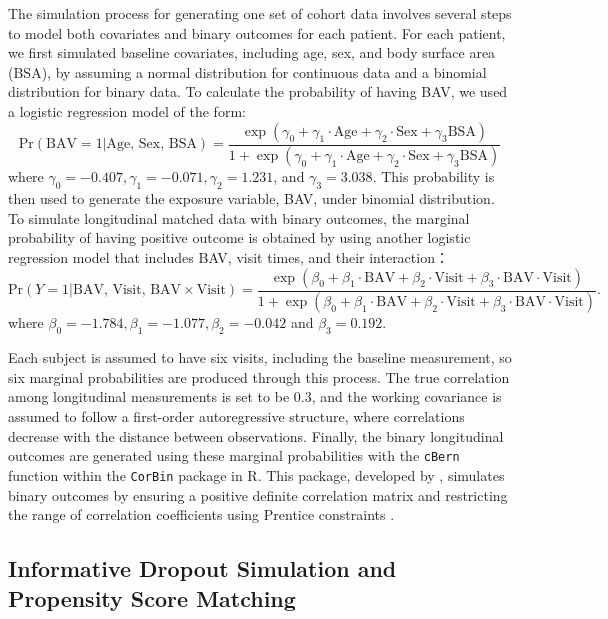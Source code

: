 \documentclass[
]{aft}
\begin{document}
The simulation process for generating one set of cohort data involves
several steps to model both covariates and binary outcomes for each
patient. For each patient, we first simulated baseline covariates,
including age, sex, and body surface area (BSA), by assuming a normal
distribution for continuous data and a binomial distribution for binary
data. To calculate the probability of having BAV, we used a logistic
regression model of the form: \[
\text{Pr}(\text{BAV} = 1 | \text{Age, Sex, BSA}) = \frac{\exp(\gamma_0 + \gamma_1 \cdot \text{Age} + \gamma_2 \cdot \text{Sex} + \gamma_3 \text{BSA})}{1+\exp(\gamma_0 + \gamma_1 \cdot \text{Age} + \gamma_2 \cdot \text{Sex} + \gamma_3 \text{BSA})}
\] where \(\gamma_0 = -0.407, \gamma_1 = -0.071, \gamma_2 = 1.231\), and
\(\gamma_3 = 3.038\). This probability is then used to generate the
exposure variable, BAV, under binomial distribution. To simulate
longitudinal matched data with binary outcomes, the marginal probability
of having positive outcome is obtained by using another logistic
regression model that includes BAV, visit times, and their interaction：
\[
\text{Pr}(Y = 1 | \text{BAV, Visit, BAV} \times \text{Visit}) = \frac{\exp(\beta_0 + \beta_1 \cdot \text{BAV} + \beta_2 \cdot \text{Visit} + \beta_3 \cdot \text{BAV}\cdot \text{Visit})}{1+\exp(\beta_0 + \beta_1 \cdot \text{BAV} + \beta_2 \cdot \text{Visit} + \beta_3 \cdot \text{BAV}\cdot \text{Visit})}.
\] where \(\beta_0 = -1.784, \beta_1 = -1.077, \beta_2 = -0.042\) and
\(\beta_3 = 0.192\).

Each subject is assumed to have six visits, including the baseline
measurement, so six marginal probabilities are produced through this
process. The true correlation among longitudinal measurements is set to
be 0.3, and the working covariance is assumed to follow a first-order
autoregressive structure, where correlations decrease with the distance
between observations. Finally, the binary longitudinal outcomes are
generated using these marginal probabilities with the \texttt{cBern}
function within the \texttt{CorBin} package in R. This package,
developed by \citet{cbernWei}, simulates binary outcomes by ensuring a
positive definite correlation matrix and restricting the range of
correlation coefficients using Prentice constraints
\citep{Prentice1988}.

\subsection{Informative Dropout Simulation and Propensity Score
Matching}\label{informative-dropout-simulation-and-propensity-score-matching}
\end{document}

